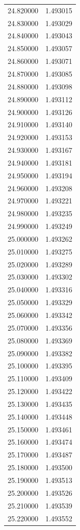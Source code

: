 \begin{tabular}{rr}
24.820000 & 1.493015 \\
24.830000 & 1.493029 \\
24.840000 & 1.493043 \\
24.850000 & 1.493057 \\
24.860000 & 1.493071 \\
24.870000 & 1.493085 \\
24.880000 & 1.493098 \\
24.890000 & 1.493112 \\
24.900000 & 1.493126 \\
24.910000 & 1.493140 \\
24.920000 & 1.493153 \\
24.930000 & 1.493167 \\
24.940000 & 1.493181 \\
24.950000 & 1.493194 \\
24.960000 & 1.493208 \\
24.970000 & 1.493221 \\
24.980000 & 1.493235 \\
24.990000 & 1.493249 \\
25.000000 & 1.493262 \\
25.010000 & 1.493275 \\
25.020000 & 1.493289 \\
25.030000 & 1.493302 \\
25.040000 & 1.493316 \\
25.050000 & 1.493329 \\
25.060000 & 1.493342 \\
25.070000 & 1.493356 \\
25.080000 & 1.493369 \\
25.090000 & 1.493382 \\
25.100000 & 1.493395 \\
25.110000 & 1.493409 \\
25.120000 & 1.493422 \\
25.130000 & 1.493435 \\
25.140000 & 1.493448 \\
25.150000 & 1.493461 \\
25.160000 & 1.493474 \\
25.170000 & 1.493487 \\
25.180000 & 1.493500 \\
25.190000 & 1.493513 \\
25.200000 & 1.493526 \\
25.210000 & 1.493539 \\
25.220000 & 1.493552 \\

\end{tabular}
